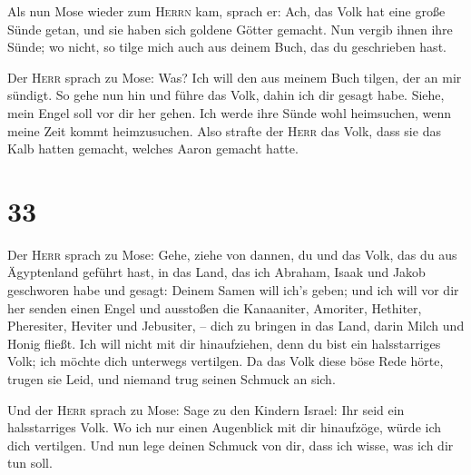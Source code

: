  Als nun Mose wieder zum \textsc{Herrn} kam, sprach er:
Ach, das Volk hat eine große Sünde getan, und sie haben sich goldene
Götter gemacht.  Nun vergib ihnen ihre Sünde; wo nicht,
so tilge mich auch aus deinem Buch, das du geschrieben hast.

 Der \textsc{Herr} sprach zu Mose: Was? Ich will den aus
meinem Buch tilgen, der an mir sündigt.  So gehe nun hin
und führe das Volk, dahin ich dir gesagt habe. Siehe, mein Engel soll
vor dir her gehen. Ich werde ihre Sünde wohl heimsuchen, wenn meine Zeit
kommt heimzusuchen.  Also strafte der \textsc{Herr} das
Volk, dass sie das Kalb hatten gemacht, welches Aaron gemacht hatte.

\hypertarget{section-32}{%
\section{33}\label{section-32}}

 Der \textsc{Herr} sprach zu Mose: Gehe, ziehe von dannen,
du und das Volk, das du aus Ägyptenland geführt hast, in das Land, das
ich Abraham, Isaak und Jakob geschworen habe und gesagt: Deinem Samen
will ich's geben;  und ich will vor dir her senden einen
Engel und ausstoßen die Kanaaniter, Amoriter, Hethiter, Pheresiter,
Heviter und Jebusiter, --  dich zu bringen in das Land,
darin Milch und Honig fließt. Ich will nicht mit dir hinaufziehen, denn
du bist ein halsstarriges Volk; ich möchte dich unterwegs vertilgen.
 Da das Volk diese böse Rede hörte, trugen sie Leid, und
niemand trug seinen Schmuck an sich.

 Und der \textsc{Herr} sprach zu Mose: Sage zu den Kindern
Israel: Ihr seid ein halsstarriges Volk. Wo ich nur einen Augenblick mit
dir hinaufzöge, würde ich dich vertilgen. Und nun lege deinen Schmuck
von dir, dass ich wisse, was ich dir tun soll.


